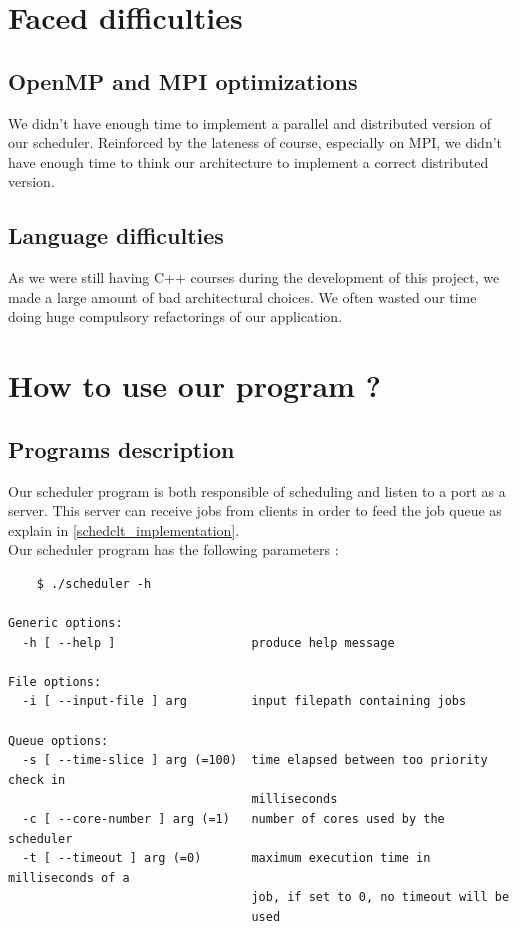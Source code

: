 \documentclass[a4paper,11pt]{article}
\begin{document}
\clearpage

\section{Faced difficulties}

\subsection{OpenMP and MPI optimizations}

We didn't have enough time to implement a parallel and distributed version of our scheduler. Reinforced by the lateness of course, especially on MPI, we didn't have enough time to think our architecture to implement a correct distributed version.

\subsection{Language difficulties}

As we were still having C++ courses during the development of this project, we made a large amount of bad architectural choices. We often wasted our time doing huge compulsory refactorings of our application.


\clearpage

\section{How to use our program ?}

\subsection{Programs description}

Our scheduler program is both responsible of scheduling and listen to a port as a server. This server can receive jobs from clients in order to feed the job queue as explain in \ref{schedclt_implementation}.\\

Our scheduler program has the following parameters :

\begin{verbatim}
    $ ./scheduler -h

Generic options:
  -h [ --help ]                   produce help message

File options:
  -i [ --input-file ] arg         input filepath containing jobs

Queue options:
  -s [ --time-slice ] arg (=100)  time elapsed between too priority check in
                                  milliseconds
  -c [ --core-number ] arg (=1)   number of cores used by the scheduler
  -t [ --timeout ] arg (=0)       maximum execution time in milliseconds of a
                                  job, if set to 0, no timeout will be
                                  used

\end{verbatim}
\end{document}
